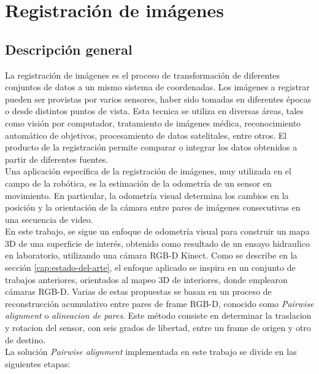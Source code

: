
\chapter{Registración de imágenes}

\section{Descripción general}
\label{sec:descripcion-general-registracion}

La registración de imágenes es el proceso de transformación de diferentes conjuntos de datos a un mismo sistema de coordenadas. Los imágenes a registrar pueden ser provistas por varios sensores, haber sido tomadas en diferentes épocas o desde distintos puntos de vista. Esta tecnica se utiliza en diversas áreas, tales como visión por computador, tratamiento de imágenes médica, reconocimiento automático de objetivos, procesamiento de datos satelitales, entre otros. El producto de la registración permite comparar o integrar los datos obtenidos a partir de diferentes fuentes. \\
Una aplicación específica de la registración de imágenes, muy utilizada en el campo de la robótica, es la estimación de la odometría de un sensor en movimiento. En particular, la odometría visual determina los cambios en la posición y la orientación de la cámara entre pares de imágenes consecutivas en una secuencia de video. \\
En este trabajo, se sigue un enfoque de odometría visual para construir un mapa 3D de una superficie de interés, obtenido como resultado de un ensayo hidraulico en laboratorio, utilizando una cámara RGB-D Kinect. Como se describe en la sección \ref{cap:estado-del-arte}, el enfoque aplicado se inspira en un conjunto de trabajos anteriores, orientados al mapeo 3D de interiores, donde emplearon cámaras RGB-D. Varias de estas propuestas se basan en un proceso de reconstrucción acumulativo entre pares de frame RGB-D, conocido como \textit{Pairwise alignment} o \textit{alineacion de pares}. Este método consiste en determinar la traslacion y rotacion del sensor, con seis grados de libertad, entre un frame de origen y otro de destino. \\
La solución \textit{Pairwise alignment} implementada en este trabajo se divide en las siguientes etapas:
